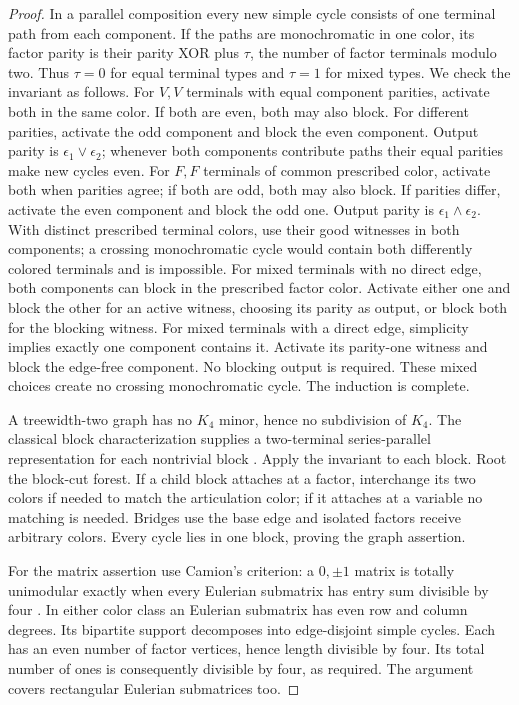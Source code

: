 \begin{proof}
In a parallel composition every new simple cycle consists of one
terminal path from each component. If the paths are monochromatic in
one color, its factor parity is their parity XOR plus $\tau$, the
number of factor terminals modulo two. Thus $\tau=0$ for equal terminal
types and $\tau=1$ for mixed types. We check the invariant as follows.
For $V,V$ terminals with equal component parities, activate both in the
same color. If both are even, both may also block. For different parities,
activate the odd component and block the even component. Output parity
is $\epsilon_1\lor\epsilon_2$; whenever both components contribute paths
their equal parities make new cycles even.
For $F,F$ terminals of common prescribed color, activate both when
parities agree; if both are odd, both may also block. If parities differ,
activate the even component and block the odd one. Output parity is
$\epsilon_1\land\epsilon_2$. With distinct prescribed terminal colors,
use their good witnesses in both components; a crossing monochromatic
cycle would contain both differently colored terminals and is impossible.
For mixed terminals with no direct edge, both components can block in
the prescribed factor color. Activate either one and block the other
for an active witness, choosing its parity as output, or block both
for the blocking witness. For mixed terminals with a direct edge,
simplicity implies exactly one component contains it. Activate its
parity-one witness and block the edge-free component. No blocking
output is required. These mixed choices create no crossing monochromatic
cycle. The induction is complete.

A treewidth-two graph has no $K_4$ minor, hence no subdivision of $K_4$.
The classical block characterization supplies a two-terminal
series-parallel representation for each nontrivial block
\citep[Theorem 3.1]{HassinTamir1986}. Apply the invariant to each block.
Root the block-cut forest. If a child block attaches at a factor,
interchange its two colors if needed to match the articulation color;
if it attaches at a variable no matching is needed. Bridges use the
base edge and isolated factors receive arbitrary colors. Every cycle
lies in one block, proving the graph assertion.

For the matrix assertion use Camion's criterion: a $0,\pm1$ matrix
is totally unimodular exactly when every Eulerian submatrix has entry
sum divisible by four \citep[Theorem 6.5]{Cornuejols2000}. In either
color class an Eulerian submatrix has even row and column degrees.
Its bipartite support decomposes into edge-disjoint simple cycles.
Each has an even number of factor vertices, hence length divisible
by four. Its total number of ones is consequently divisible by four,
as required. The argument covers rectangular Eulerian submatrices too.
\end{proof}

